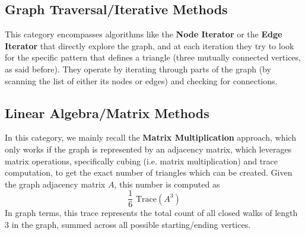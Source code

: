 \documentclass{aes2e}
\begin{document}
\subsection{Graph Traversal/Iterative Methods}
This category encompasses algorithms like the \textbf{Node Iterator}\cite{DEK1, DEK2} or the \textbf{Edge Iterator}\cite{DEK1, DEK2} that directly explore the graph, and at each iteration they try to look for the specific pattern that defines a triangle (three mutually connected vertices, as said before). They operate by iterating through parts of the graph (by scanning the list of either its nodes or edges) and checking for connections.
\subsection{Linear Algebra/Matrix Methods}
In this category, we mainly recall the \textbf{Matrix Multiplication} approach\cite{DEK2}, which only works if the graph is represented by an adjacency matrix, which leverages matrix operations, specifically cubing (i.e. matrix multiplication) and trace computation, to get the exact number of triangles which can be created. Given the graph adjacency matrix $A$, this number is computed as $$\frac{1}{6} \text{ Trace}(A^3)$$ In graph terms, this trace represents the total count of all closed walks of length 3 in the graph, summed across all possible starting/ending vertices. 
\end{document}
